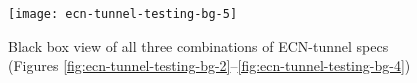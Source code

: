 \begin{figure}[h]
	\centering
	\texttt{[image: ecn-tunnel-testing-bg-5]}
	\caption{Black box view of all three combinations of ECN-tunnel specs (Figures \ref{fig:ecn-tunnel-testing-bg-2}--\ref{fig:ecn-tunnel-testing-bg-4})}\label{fig:ecn-tunnel-testing-bg-5}
\end{figure}





